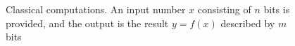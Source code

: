 \begin{figure}
\centering



\caption{Classical computations. An input number $x$ consisting of $n$ bits is provided, and the output is the result $y = f\left(x\right)$ described by $m$ bits}
\label{figQuantCompClassComp}
\end{figure}